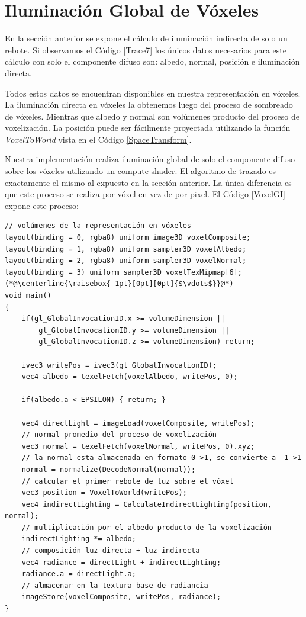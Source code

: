 \section{Iluminación Global de Vóxeles} %
\label{sec:iluminacion_global_de_voxeles_impl}
En la sección anterior se expone el cálculo de iluminación indirecta de solo un rebote. Si observamos el Código \ref{Trace7} los únicos datos necesarios para este cálculo con solo el componente difuso son: albedo, normal, posición e iluminación directa.

Todos estos datos se encuentran disponibles en nuestra representación en vóxeles. La iluminación directa en vóxeles la obtenemos luego del proceso de sombreado de vóxeles. Mientras que albedo y normal son volúmenes producto del proceso de voxelización. La posición puede ser fácilmente proyectada utilizando la función \emph{VoxelToWorld} vista en el Código \ref{SpaceTransform}.

Nuestra implementación realiza iluminación global de solo el componente difuso sobre los vóxeles utilizando un compute shader. El algoritmo de trazado es exactamente el mismo al expuesto en la sección anterior. La única diferencia es que este proceso se realiza por vóxel en vez de por pixel. El Código \ref{VoxelGI} expone este proceso:
\\
\begin{lstlisting}[caption={Iluminacion global sobre voxeles.}, label=VoxelGI]
// volúmenes de la representación en vóxeles
layout(binding = 0, rgba8) uniform image3D voxelComposite;
layout(binding = 1, rgba8) uniform sampler3D voxelAlbedo;
layout(binding = 2, rgba8) uniform sampler3D voxelNormal;
layout(binding = 3) uniform sampler3D voxelTexMipmap[6];
(*@\centerline{\raisebox{-1pt}[0pt][0pt]{$\vdots$}}@*)
void main()
{
    if(gl_GlobalInvocationID.x >= volumeDimension ||
        gl_GlobalInvocationID.y >= volumeDimension ||
        gl_GlobalInvocationID.z >= volumeDimension) return;

    ivec3 writePos = ivec3(gl_GlobalInvocationID);
    vec4 albedo = texelFetch(voxelAlbedo, writePos, 0);

    if(albedo.a < EPSILON) { return; }

    vec4 directLight = imageLoad(voxelComposite, writePos);
    // normal promedio del proceso de voxelización
    vec3 normal = texelFetch(voxelNormal, writePos, 0).xyz;
    // la normal esta almacenada en formato 0->1, se convierte a -1->1
    normal = normalize(DecodeNormal(normal));
    // calcular el primer rebote de luz sobre el vóxel
    vec3 position = VoxelToWorld(writePos);
    vec4 indirectLighting = CalculateIndirectLighting(position, normal);
    // multiplicación por el albedo producto de la voxelización
    indirectLighting *= albedo;
    // composición luz directa + luz indirecta
    vec4 radiance = directLight + indirectLighting;
    radiance.a = directLight.a;
    // almacenar en la textura base de radiancia
    imageStore(voxelComposite, writePos, radiance);
}
\end{lstlisting}

